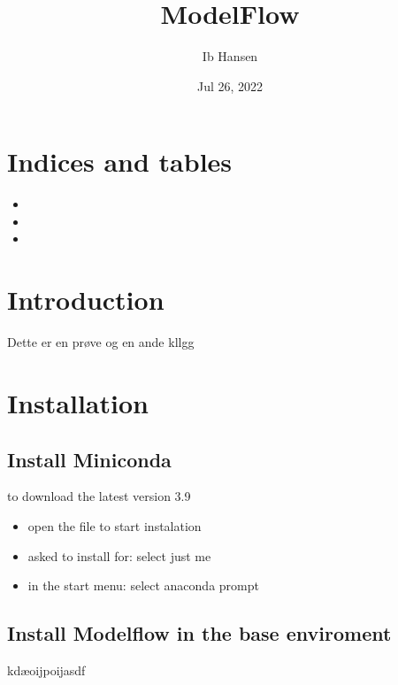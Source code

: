 \documentclass[letterpaper,10pt,english]{sphinxmanual}
\title{ModelFlow}
\date{Jul 26, 2022}
\author{Ib Hansen}
\begin{document}
\pagestyle{empty}
\sphinxmaketitle
\pagestyle{plain}
\sphinxtableofcontents
\pagestyle{normal}
\label{\detokenize{index::doc}}



\chapter{Indices and tables}
\label{\detokenize{index:indices-and-tables}}\begin{itemize}
\item {} 
\sphinxAtStartPar
{}

\item {} 
\sphinxAtStartPar
{}

\item {} 
\sphinxAtStartPar
{}

\end{itemize}


\chapter{Introduction}
\label{\detokenize{index:introduction}}
\sphinxAtStartPar
Dette er en prøve
og en ande kllgg


\chapter{Installation}
\label{\detokenize{index:installation}}

\section{Install Miniconda}
\label{\detokenize{index:install-miniconda}}
\sphinxAtStartPar
{} to download the latest version 3.9
\begin{itemize}
\item {} 
\sphinxAtStartPar
open the file to start instalation

\item {} 
\sphinxAtStartPar
asked to install for: select just me

\item {} 
\sphinxAtStartPar
in the start menu: select anaconda prompt

\end{itemize}


\section{Install Modelflow in the base enviroment}
\label{\detokenize{index:install-modelflow-in-the-base-enviroment}}
\sphinxAtStartPar
kdæoijpoijasdf
\end{document}
